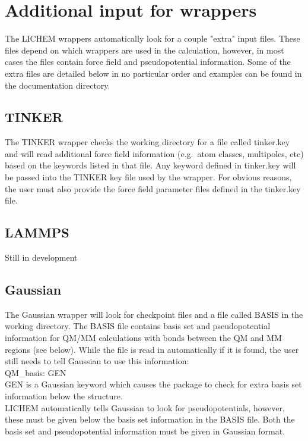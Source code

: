 \documentclass[12pt]{report}
\begin{document}
\section{Additional input for wrappers}

The LICHEM wrappers automatically look for a couple "extra" input files.
These files depend on which wrappers are used in the calculation, however, in
most cases the files contain force field and pseudopotential information.
Some of the extra files are detailed below in no particular order and examples
can be found in the documentation directory.

\subsection{TINKER}

The TINKER wrapper checks the working directory for a file called tinker.key
and will read additional force field information (e.g.\ atom classes,
multipoles, etc) based on the keywords listed in that file.
Any keyword defined in tinker.key will be passed into the TINKER key file used
by the wrapper.
For obvious reasons, the user must also provide the force field parameter
files defined in the tinker.key file.

\subsection{LAMMPS}

{\color{red}Still in development}

\subsection{Gaussian}

The Gaussian wrapper will look for checkpoint files and a file called BASIS in
the working directory.
The BASIS file contains basis set and pseudopotential information for QM/MM
calculations with bonds between the QM and MM regions (see below).
While the file is read in automatically if it is found, the user still needs
to tell Gaussian to use this information: \\

QM\_basis: GEN \\

GEN is a Gaussian keyword which causes the package to check for extra basis
set information below the structure. \\

LICHEM automatically tells Gaussian to look for pseudopotentials, however,
these must be given below the basis set information in the BASIS file.
Both the basis set and pseudopotential information must be given in Gaussian
format.
\end{document}
